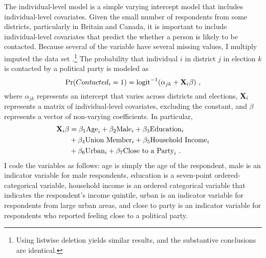 \documentclass[12pt]{article}
\begin{document}
The individual-level model is a simple varying intercept model that includes individual-level covariates. Given the small number of respondents from some districts, particularly in Britain and Canada, it is important to include individual-level covariates that  predict the whether a person is likely to be contacted. Because several of the variable have several missing values, I multiply imputed the data set \citep{Rubin1987, Kingetal2001}.\footnote{Using listwise deletion yields similar results, and the substantive conclusions are identical.} The probability that individual $i$ in district $j$ in election $k$ is contacted by a political party is modeled as
\begin{equation}
\text{Pr}(Contacted_{i} = 1) = \text{logit}^{-1}(\alpha_{jk} + {\bf X}_i\beta) \text{ ,}
\end{equation}\vspace{3mm}
where $\alpha_{jk}$ represents an intercept that varies across districts and elections, ${\bf X}_i$ represents a matrix of individual-level covariates, excluding the constant, and $\beta$ represents a vector of non-varying coefficients. In particular,
\begin{align}
{\bf X}_i\beta & = \beta_{1}\text{Age}_i + \beta_{2}\text{Male}_i + \beta_{3}\text{Education}_i \nonumber\\
& + \beta_{4}\text{Union Member}_i + \beta_{5}\text{Household Income}_i\\
& + \beta_{6}\text{Urban}_i + \beta_{7}\text{Close to a Party}_i \text{ .} \nonumber
\end{align}
\noindent I code the variables as follows: age is simply the age of the respondent, male is an indicator variable for male respondents, education is a seven-point ordered-categorical variable, household income is an ordered categorical variable that indicates the respondent's income quintile, urban is an indicator variable for respondents from large urban areas, and close to party is an indicator variable for respondents who reported feeling close to a political party.
\end{document}
